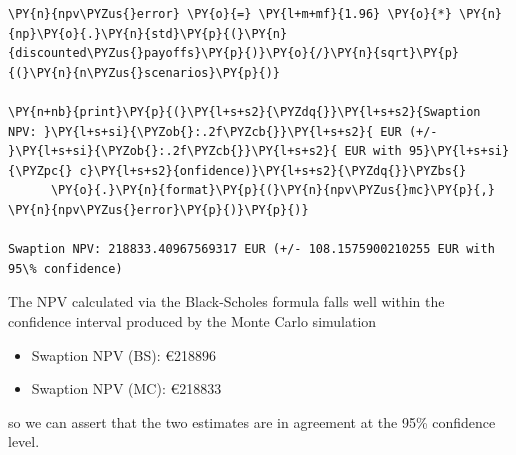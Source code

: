 \begin{tcolorbox}[breakable, size=fbox, boxrule=1pt, pad at break*=1mm,colback=cellbackground, colframe=cellborder]
\begin{Verbatim}[commandchars=\\\{\}]
\PY{n}{npv\PYZus{}error} \PY{o}{=} \PY{l+m+mf}{1.96} \PY{o}{*} \PY{n}{np}\PY{o}{.}\PY{n}{std}\PY{p}{(}\PY{n}{discounted\PYZus{}payoffs}\PY{p}{)}\PY{o}{/}\PY{n}{sqrt}\PY{p}{(}\PY{n}{n\PYZus{}scenarios}\PY{p}{)}
				
\PY{n+nb}{print}\PY{p}{(}\PY{l+s+s2}{\PYZdq{}}\PY{l+s+s2}{Swaption NPV: }\PY{l+s+si}{\PYZob{}:.2f\PYZcb{}}\PY{l+s+s2}{ EUR (+/- }\PY{l+s+si}{\PYZob{}:.2f\PYZcb{}}\PY{l+s+s2}{ EUR with 95}\PY{l+s+si}{\PYZpc{} c}\PY{l+s+s2}{onfidence)}\PY{l+s+s2}{\PYZdq{}}\PYZbs{}
      \PY{o}{.}\PY{n}{format}\PY{p}{(}\PY{n}{npv\PYZus{}mc}\PY{p}{,} \PY{n}{npv\PYZus{}error}\PY{p}{)}\PY{p}{)}

Swaption NPV: 218833.40967569317 EUR (+/- 108.1575900210255 EUR with 95\% confidence)
\end{Verbatim}
\end{tcolorbox}

The NPV calculated via the Black-Scholes formula
falls well within the confidence interval produced by the Monte Carlo
simulation

\begin{itemize}
\tightlist
\item
  Swaption NPV (BS): \euro{218896}
\item
  Swaption NPV (MC): \euro{218833}
\end{itemize}
so we can assert that the two estimates are in agreement at the 95\% confidence level.
